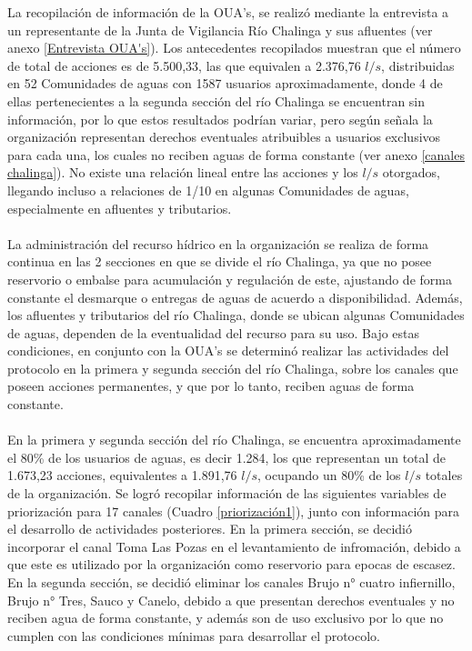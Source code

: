\documentclass[]{article}
\begin{document}
La recopilación de información de la OUA's, se realizó mediante la entrevista a un representante de la Junta de Vigilancia Río Chalinga y sus afluentes (ver anexo \ref{Entrevista OUA's}). Los antecedentes recopilados muestran que el número de total de acciones es de 5.500,33, las que equivalen a 2.376,76 $l/s$, distribuidas en 52 Comunidades de aguas con 1587 usuarios aproximadamente, donde 4 de ellas pertenecientes a la segunda sección del río Chalinga se encuentran sin información, por lo que estos resultados podrían variar, pero según señala la organización representan derechos eventuales atribuibles a usuarios exclusivos para cada una, los cuales no reciben aguas de forma constante (ver anexo \ref{canales chalinga}). No existe una relación lineal entre las acciones y los $l/s$ otorgados, llegando incluso a relaciones de 1/10 en algunas Comunidades de aguas, especialmente en afluentes y tributarios. \\
\\
La administración del recurso hídrico en la organización se realiza de forma continua en las 2 secciones en que se divide el río Chalinga, ya que no posee reservorio o embalse para acumulación y regulación de este, ajustando de forma constante el desmarque o entregas de aguas de acuerdo a disponibilidad. Además, los afluentes y tributarios del río Chalinga, donde se ubican algunas Comunidades de aguas, dependen de la eventualidad del recurso para su uso. Bajo estas condiciones, en conjunto con la OUA's se determinó realizar las actividades del protocolo en la primera y segunda sección del río Chalinga, sobre los canales que poseen acciones permanentes, y que por lo tanto, reciben aguas de forma constante. \\
\\
En la primera y segunda sección del río Chalinga, se encuentra aproximadamente el 80\% de los usuarios de aguas, es decir 1.284, los que representan un total de 1.673,23 acciones, equivalentes a 1.891,76 $l/s$, ocupando un 80\% de los $l/s$ totales de la organización. Se logró recopilar información de las siguientes variables de priorización para 17 canales (Cuadro \ref{priorización1}), junto con información para el desarrollo de actividades posteriores. En la primera sección, se decidió incorporar el canal Toma Las Pozas en el levantamiento de infromación, debido a que este es utilizado por la organización como reservorio para epocas de escasez. En la segunda sección, se decidió eliminar los canales Brujo n° cuatro infiernillo, Brujo n° Tres, Sauco y Canelo, debido a que presentan derechos eventuales y no reciben agua de forma constante, y además son de uso exclusivo por lo que no cumplen con las condiciones mínimas para desarrollar el protocolo. 
\end{document}
